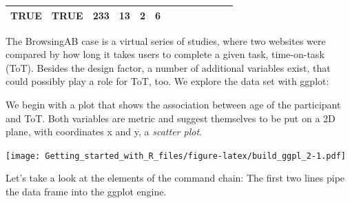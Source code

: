\documentclass[]{svmono}
\newenvironment{Shaded}{\begin{snugshade}}{\end{snugshade}}
\newcommand{\KeywordTok}[1]{\textcolor[rgb]{0.13,0.29,0.53}{\textbf{#1}}}
\newcommand{\DataTypeTok}[1]{\textcolor[rgb]{0.13,0.29,0.53}{#1}}
\newcommand{\StringTok}[1]{\textcolor[rgb]{0.31,0.60,0.02}{#1}}
\newcommand{\OperatorTok}[1]{\textcolor[rgb]{0.81,0.36,0.00}{\textbf{#1}}}
\newcommand{\NormalTok}[1]{#1}
\theoremstyle{definition}
\theoremstyle{definition}
\theoremstyle{definition}
\theoremstyle{remark}
\begin{document}
\begin{longtable}[]{@{}rrllllrllrrrr@{}}
\begin{minipage}[t]{0.08\columnwidth}
TRUE\strut
\end{minipage} & \begin{minipage}[t]{0.08\columnwidth}\raggedright\strut
TRUE\strut
\end{minipage} & \begin{minipage}[t]{0.03\columnwidth}\raggedleft\strut
233\strut
\end{minipage} & \begin{minipage}[t]{0.05\columnwidth}\raggedleft\strut
13\strut
\end{minipage} & \begin{minipage}[t]{0.06\columnwidth}\raggedleft\strut
2\strut
\end{minipage} & \begin{minipage}[t]{0.05\columnwidth}\raggedleft\strut
6\strut
\end{minipage}\tabularnewline
\bottomrule
\end{longtable}

The BrowsingAB case is a virtual series of studies, where two websites
were compared by how long it takes users to complete a given task,
time-on-task (ToT). Besides the design factor, a number of additional
variables exist, that could possibly play a role for ToT, too. We
explore the data set with ggplot:

We begin with a plot that shows the association between age of the
participant and ToT. Both variables are metric and suggest themselves to
be put on a 2D plane, with coordinates x and y, a \emph{scatter plot}.

\begin{Shaded}
\end{Shaded}

\texttt{[image: Getting\_started\_with\_R\_files/figure-latex/build\_ggpl\_2-1.pdf]}

Let's take a look at the elements of the command chain: The first two
lines pipe the data frame into the ggplot engine.

\begin{Shaded}
\end{Shaded}
\end{document}
